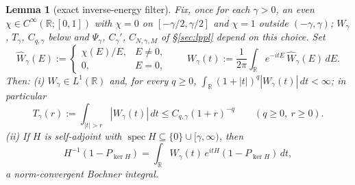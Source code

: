 \documentclass[11pt,a4paper]{article}
\theoremstyle{plain}
\newtheorem{lemma}[theorem]{Lemma}
\theoremstyle{definition}
\theoremstyle{plain}
\theoremstyle{definition}
\newcommand{\R}{\mathbb{R}}
\DeclareMathOperator{\spec}{spec}
\begin{document}
\begin{lemma}[exact inverse-energy filter]\label{lem:filter}
Fix, once for each $\gamma>0$, an even $\chi\in C^\infty(\R;[0,1])$ with $\chi=0$ on
$[-\gamma/2,\gamma/2]$ and $\chi=1$ outside $(-\gamma,\gamma)$; $W_\gamma$, $T_\gamma$,
$C_{q,\gamma}$ below and $\Psi_\gamma$, $C_\gamma'$, $C_{N,\gamma,M}$ of \S\ref{sec:lppl}
depend on this choice.  Set
\begin{equation}
 \widehat W_\gamma(E):=\begin{cases}\chi(E)/E,&E\ne0,\\0,&E=0,\end{cases}
 \qquad
 W_\gamma(t):=\frac1{2\pi}\int_\R e^{-itE}\,\widehat W_\gamma(E)\,dE .
 \label{eq:filterdef}
\end{equation}
Then:
\emph{(i)} $W_\gamma\in L^1(\R)$ and, for every $q\ge0$,
$\int_\R(1+|t|)^q|W_\gamma(t)|\,dt<\infty$; in particular
\[
 T_\gamma(r):=\int_{|t|>r}|W_\gamma(t)|\,dt
 \le C_{q,\gamma}(1+r)^{-q}\qquad(q\ge0,\ r\ge0).
\]
\emph{(ii)} If $H$ is self-adjoint with
$\spec H\subseteq\{0\}\cup[\gamma,\infty)$, then
\begin{equation}
 H^{-1}(1-P_{\ker H})=\int_\R W_\gamma(t)\,e^{itH}(1-P_{\ker H})\,dt ,
 \label{eq:filterid}
\end{equation}
a norm-convergent Bochner integral.
\end{lemma}
\end{document}
